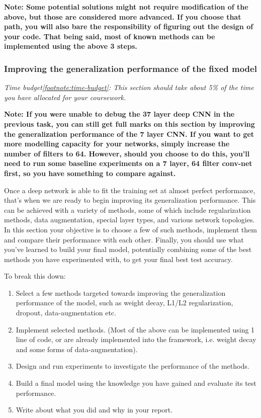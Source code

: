 \documentclass[11pt,]{article}
\begin{document}
\textbf{Note: Some potential solutions might not require modification of the above, but those are considered more advanced. If you choose that path, you will also bare the responsibility of figuring out the design of your code. That being said, most of known methods can be implemented using the above 3 steps.}

\subsubsection{Improving the generalization performance of the fixed model}   

\textit{Time budget\cref{footnote:time-budget}: This section should take about 5\% of the time you have allocated for your coursework.}\newline

\textbf{Note: If you were unable to debug the 37 layer deep CNN in the previous task, you can still get full marks on this section by improving the generalization performance of the 7 layer CNN. If you want to get more modelling capacity for your networks, simply increase the number of filters to 64. However, should you choose to do this, you'll need to run some baseline experiments on a 7 layer, 64 filter conv-net first, so you have something to compare against.}

Once a deep network is able to fit the training set at almost perfect performance, that's when we are ready to begin improving its generalization performance. This can be achieved with a variety of methods, some of which include regularization methods, data augmentation, special layer types, and various network topologies.
In this section your objective is to choose a few of such methods, implement them and compare their performance with each other. Finally, you should use what you've learned to build your final model, potentially combining some of the best methods you have experimented with, to get your final best test accuracy.

To break this down:

\begin{enumerate}
    \item Select a few methods targeted towards improving the generalization performance of the model, such as weight decay, L1/L2 regularization, dropout, data-augmentation etc.
    \item Implement selected methods. (Most of the above can be implemented using 1 line of code, or are already implemented into the framework, i.e. weight decay and some forms of data-augmentation).
    \item Design and run experiments to investigate the performance of the methods.
    \item Build a final model using the knowledge you have gained and evaluate its test performance.
    \item Write about what you did and why in your report.
\end{enumerate}
\end{document}
